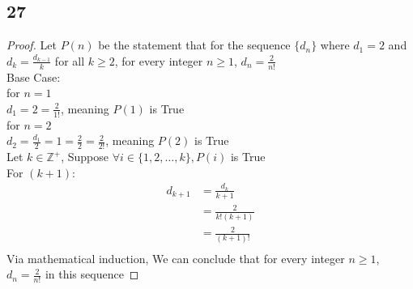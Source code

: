 \documentclass{article}
\begin{document}
\subsection{27}
\begin{proof}
    Let $P(n)$ be the statement that for the sequence $\{d_n\}$ where $d_1 = 2 $ and $d_k = \frac{d_{k-1}}{k}$ for all $k \geq 2$, for every integer $n \geq 1 $, $d_n = \frac{2}{n!}$\\
    Base Case: \\
    for $n = 1$\\
    $d_1 = 2 = \frac{2}{1!}$, meaning $P(1)$ is True\\
    for $n = 2$\\
    $d_2 = \frac{d_1}{2} = 1 =\frac{2}{2} = \frac{2}{2!}$, meaning $P(2)$ is True\\
    Let $k \in \mathbb{Z^+}$, Suppose $\forall i \in \{1,2,\ldots,k\}, P(i)$ is True\\
    For $(k+1)$:
    \begin{align*}
        d_{k+1} &= \frac{d_k}{k+1}\\
        &= \frac{2}{k!(k+1)}\\
        &=\frac{2}{(k+1)!}\\
    \end{align*}
    Via mathematical induction, We can conclude that for every integer $n \geq 1 $, $d_n = \frac{2}{n!}$ in this sequence  
\end{proof}
\end{document}
